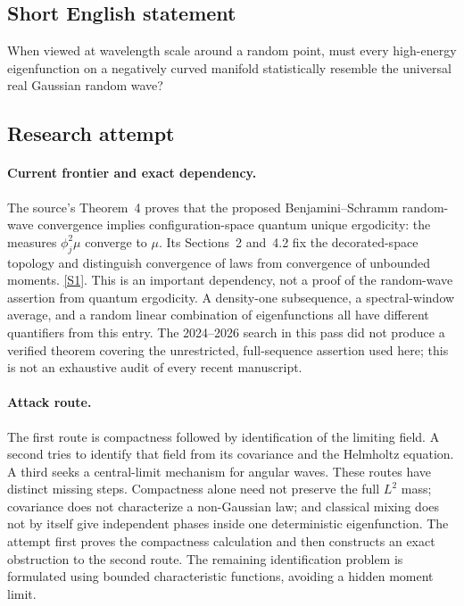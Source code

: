 \documentclass[11pt,a4paper]{article}
\newcommand{\sref}[2]{\hyperlink{source:#1:#2}{[S#2]}}
\numberwithin{equation}{section}
\begin{document}
\subsection{Short English statement}
When viewed at wavelength scale around a random point, must every high-energy eigenfunction on a negatively curved manifold statistically resemble the universal real Gaussian random wave?
\subsection{Research attempt}

\paragraph{Current frontier and exact dependency.}
The source's Theorem~4 proves that the proposed Benjamini--Schramm
random-wave convergence implies configuration-space quantum unique
ergodicity: the measures $\phi_j^2\mu$ converge to $\mu$. Its
Sections~2 and~4.2 fix the decorated-space topology and distinguish
convergence of laws from convergence of unbounded moments.
\sref{229}{1}. This is an important dependency, not a proof of the
random-wave assertion from quantum ergodicity. A density-one subsequence,
a spectral-window average, and a random linear combination of
eigenfunctions all have different quantifiers from this entry.
The 2024--2026 search in this pass did not produce a verified theorem
covering the unrestricted, full-sequence assertion used here; this is
not an exhaustive audit of every recent manuscript.

\paragraph{Attack route.}
The first route is compactness followed by identification of the limiting
field. A second tries to identify that field from its covariance and the
Helmholtz equation. A third seeks a central-limit mechanism for angular
waves. These routes have distinct missing steps. Compactness alone need
not preserve the full $L^2$ mass; covariance does not characterize a
non-Gaussian law; and classical mixing does not by itself give independent
phases inside one deterministic eigenfunction. The attempt first proves
the compactness calculation and then constructs an exact obstruction to
the second route. The remaining identification problem is formulated
using bounded characteristic functions, avoiding a hidden moment limit.
\end{document}
